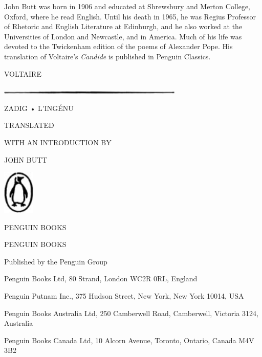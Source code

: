 \documentclass{article}
\begin{document}
John Butt was born in 1906 and educated at Shrewsbury and Merton College, Oxford, 
where he read English. Until his death in 1965, he was Regius Professor of Rhetoric 
and English Literature at Edinburgh, and he also worked at the Universities of 
London and Newcastle, and in America. Much of his life was devoted to the Twickenham 
edition of the poems of Alexander Pope. His translation of Voltaire's \textit{Candide} 
is published in Penguin Classics.\pagebreak{} 

\begin{center}
VOLTAIRE  

\includegraphics[width=250pt, height=5pt, keepaspectratio=true]{Zadig or L'Ingenu - Voltaire-fig002.jpg}

 

ZADIG • L'INGÉNU 

TRANSLATED 

WITH AN INTRODUCTION BY 

JOHN BUTT  

\includegraphics[width=43pt, height=60pt, keepaspectratio=true]{Zadig or L'Ingenu - Voltaire-fig003.jpg}

 

PENGUIN BOOKS\pagebreak{} 

PENGUIN BOOKS 

Published by the Penguin Group 

Penguin Books Ltd, 80 Strand, London WC2R 0RL, England 

Penguin Putnam Inc., 375 Hudson Street, New York, New York 10014, USA 

Penguin Books Australia Ltd, 250 Camberwell Road, Camberwell, Victoria 3124, Australia 

Penguin Books Canada Ltd, 10 Alcorn Avenue, Toronto, Ontario, Canada M4V 3B2 


\end{center}
\end{document}
